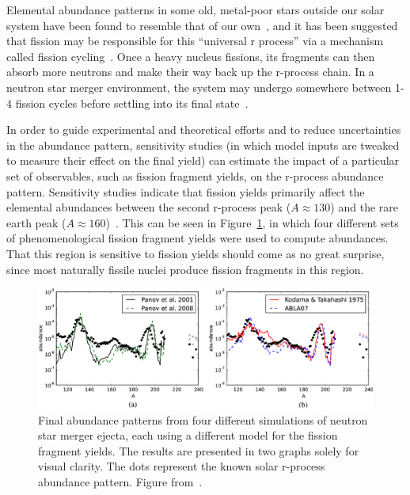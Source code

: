 Elemental abundance patterns in some old, metal-poor stars outside our solar system have been found to resemble that of our own~\cite{Arnould2007}, and it has been suggested that fission may be responsible for this ``universal r process'' via a mechanism called fission cycling~\cite{Beun2008}. Once a heavy nucleus fissions, its fragments can then absorb more neutrons and make their way back up the r-process chain. In a neutron star merger environment, the system may undergo somewhere between 1-4 fission cycles before settling into its final state~\cite{Mendoza2015}.

In order to guide experimental and theoretical efforts and to reduce uncertainties in the abundance pattern, sensitivity studies (in which model inputs are tweaked to measure their effect on the final yield) can estimate the impact of a particular set of observables, such as fission fragment yields, on the r-process abundance pattern. Sensitivity studies indicate that fission yields primarily affect the elemental abundances between the second r-process peak ($A\approx130$) and the rare earth peak ($A\approx160$)~\cite{Goriely2015a, Eichler2015}. This can be seen in Figure~\ref{fig:rprocabundances}, in which four different sets of phenomenological fission fragment yields were used to compute abundances. That this region is sensitive to fission yields should come as no great surprise, since most naturally fissile nuclei produce fission fragments in this region.

\begin{figure}
	\centering
	\includegraphics[width=0.9\linewidth]{TeX_files/rProc_abundances}
	\caption[Final abundance patterns from four different simulations of neutron star merger ejecta, each using a different model for the fission fragment yields. The results are presented in two graphs solely for visual clarity. The dots represent the known solar r-process abundance pattern. Figure from~\cite{Eichler2015}.]{Final abundance patterns from four different simulations of neutron star merger ejecta, each using a different model for the fission fragment yields. The results are presented in two graphs solely for visual clarity. The dots represent the known solar r-process abundance pattern. Figure from~\cite{Eichler2015}.}
	\label{fig:rprocabundances}
\end{figure}

